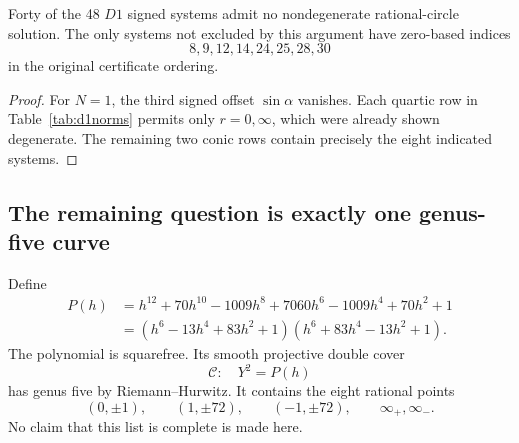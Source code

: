 \begin{corollary}\label{cor:d1forty}
Forty of the 48 $D1$ signed systems admit no nondegenerate rational-circle solution. The only systems not excluded by this argument have zero-based indices
\[
 8,9,12,14,24,25,28,30
\]
in the original certificate ordering.
\end{corollary}
\begin{proof}
For $N=1$, the third signed offset $\sin\alpha$ vanishes. Each quartic row in Table~\ref{tab:d1norms} permits only $r=0,\infty$, which were already shown degenerate. The remaining two conic rows contain precisely the eight indicated systems.
\end{proof}

\subsection{The remaining question is exactly one genus-five curve}
Define
\begin{align}
 P(h)&=h^{12}+70h^{10}-1009h^8+7060h^6-1009h^4+70h^2+1\label{eq:d1P}\\
 &= (h^6-13h^4+83h^2+1)(h^6+83h^4-13h^2+1).\nonumber
\end{align}
The polynomial is squarefree. Its smooth projective double cover
\[
 \mathcal C:\quad Y^2=P(h)
\]
has genus five by Riemann--Hurwitz. It contains the eight rational points
\begin{equation}\label{eq:d1known}
 (0,\pm1),\qquad(1,\pm72),\qquad(-1,\pm72),\qquad\infty_+,\infty_-.
\end{equation}
No claim that this list is complete is made here.

